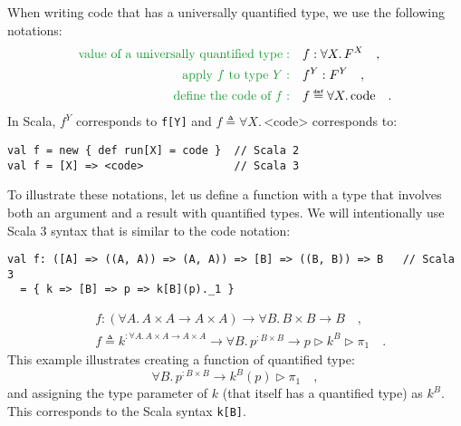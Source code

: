 When writing code that has a universally quantified type, we use the
following notations:
\begin{align*}
{\color{greenunder}\text{value of a universally quantified type}:}\quad & f:\forall X.\,F^{X}\quad,\\
{\color{greenunder}\text{apply }f\text{ to type }Y:}\quad & f^{Y}:F^{Y}\quad,\\
{\color{greenunder}\text{define the code of }f:}\quad & f\triangleq\forall X.\,\text{code}\quad.
\end{align*}
In Scala, $f^{Y}$ corresponds to \lstinline!f[Y]! and $f\triangleq\forall X.\,\text{<code>}$
corresponds to:
\begin{lstlisting}
val f = new { def run[X] = code }  // Scala 2
val f = [X] => <code>              // Scala 3
\end{lstlisting}

To illustrate these notations, let us define a function with a type
that involves both an argument and a result with quantified types.
We will intentionally use Scala 3 syntax that is similar to the code
notation:
\begin{lstlisting}
val f: ([A] => ((A, A)) => (A, A)) => [B] => ((B, B)) => B   // Scala 3
  = { k => [B] => p => k[B](p)._1 }
\end{lstlisting}
\begin{align*}
 & f:(\forall A.\,A\times A\rightarrow A\times A)\rightarrow\forall B.\,B\times B\rightarrow B\quad,\\
 & f\triangleq k^{:\forall A.\,A\times A\rightarrow A\times A}\rightarrow\forall B.\,p^{:B\times B}\rightarrow p\triangleright k^{B}\triangleright\pi_{1}\quad.
\end{align*}
This example illustrates creating a function of quantified type:
\[
\forall B.\,p^{:B\times B}\rightarrow k^{B}(p)\triangleright\pi_{1}\quad,
\]
and assigning the type parameter of $k$ (that itself has a quantified
type) as $k^{B}$. This corresponds to the Scala syntax \lstinline!k[B]!.

